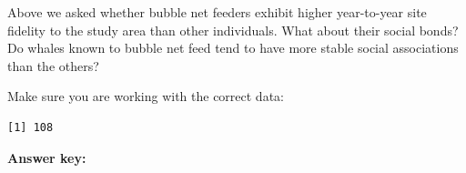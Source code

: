 \documentclass[
]{book}
\newenvironment{Shaded}{\begin{snugshade}}{\end{snugshade}}
\newcommand{\CommentTok}[1]{\textcolor[rgb]{0.56,0.35,0.01}{\textit{#1}}}
\newcommand{\KeywordTok}[1]{\textcolor[rgb]{0.13,0.29,0.53}{\textbf{#1}}}
\newcommand{\NormalTok}[1]{#1}
\newcommand{\OperatorTok}[1]{\textcolor[rgb]{0.81,0.36,0.00}{\textbf{#1}}}
\newcommand{\StringTok}[1]{\textcolor[rgb]{0.31,0.60,0.02}{#1}}
\begin{document}
Above we asked whether bubble net feeders exhibit higher year-to-year site fidelity to the study area than other individuals. What about their social bonds? Do whales known to bubble net feed tend to have more stable social associations than the others?

Make sure you are working with the correct data:

\begin{Shaded}
\end{Shaded}

\begin{verbatim}
[1] 108
\end{verbatim}

\textbf{Answer key:}
\end{document}
